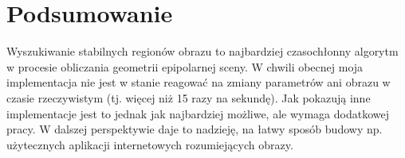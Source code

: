 
\section{Podsumowanie}

Wyszukiwanie stabilnych regionów obrazu to najbardziej czasochłonny algorytm w
procesie obliczania geometrii epipolarnej sceny. W chwili obecnej moja
implementacja nie jest w stanie reagować na zmiany parametrów ani obrazu w
czasie rzeczywistym (tj. więcej niż 15 razy na sekundę). Jak pokazują inne
implementacje jest to jednak jak najbardziej możliwe, ale wymaga dodatkowej
pracy.  W dalszej perspektywie daje to nadzieję, na łatwy sposób budowy
np. użytecznych aplikacji internetowych rozumiejących obrazy.
